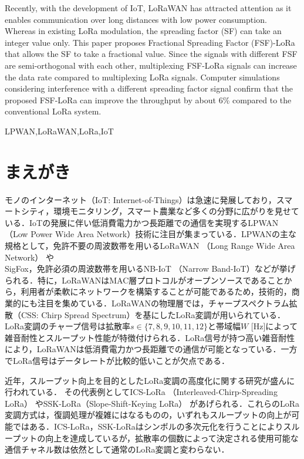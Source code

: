 \documentclass[technicalreport]{ieicej}
\begin{document}
\begin{eabstract}
Recently, with the development of IoT, LoRaWAN has attracted attention as it enables communication over long distances with low power consumption.
Whereas in existing LoRa modulation, the spreading factor (SF) can take an integer value only. This paper proposes Fractional Spreading Factor (FSF)-LoRa that allows the SF to take a fractional value.
Since the signals with different FSF are semi-orthogonal with each other, multiplexing FSF-LoRa signals can increase the data rate compared to multiplexing LoRa signals.
Computer simulations considering interference with a different spreading factor signal confirm that the proposed FSF-LoRa can improve the throughput by about 6\% compared to the conventional LoRa system.
\end{eabstract}
\begin{ekeyword}
LPWAN,\:LoRaWAN,\:LoRa,\:IoT
\end{ekeyword}
\maketitle

\section{まえがき}

モノのインターネット（IoT: Internet-of-Things）は急速に発展しており，スマートシティ，環境モニタリング，スマート農業など多くの分野に広がりを見せている．IoTの発展に伴い低消費電力かつ長距離での通信を実現するLPWAN（Low Power Wide Area Network）技術に注目が集まっている\cite{7815384}．LPWANの主な規格として，免許不要の周波数帯を用いるLoRaWAN （Long Range Wide Area Network）\cite{7803607} やSigFox\cite{sigfox}，免許必須の周波数帯を用いるNB-IoT （Narrow Band-IoT）\cite{7876968}などが挙げられる．特に，LoRaWANはMAC層プロトコルがオープンソースであることから，利用者が柔軟にネットワークを構築することが可能であるため，技術的，商業的にも注目を集めている\cite{7803607,8795313}．LoRaWANの物理層では，チャープスペクトラム拡散（CSS: Chirp Spread Spectrum）を基にしたLoRa変調が用いられている\cite{WhatIsLoRa}．LoRa変調のチャープ信号は拡散率$s\in\{7, 8, 9, 10, 11, 12\}$と帯域幅$W$ [Hz]によって雑音耐性とスループット性能が特徴付けられる．LoRa信号が持つ高い雑音耐性により，LoRaWANは低消費電力かつ長距離での通信が可能となっている．一方でLoRa信号はデータレートが比較的低いことが欠点である．

近年，スループット向上を目的としたLoRa変調の高度化に関する研究が盛んに行われている\cite{10391276}．
その代表例としてICS-LoRa （Interleaved-Chirp-Spreading LoRa） \cite{8607020}やSSK-LoRa（Slope-Shift-Keying LoRa） \cite{9709288}があげられる．これらのLoRa変調方式は，復調処理が複雑にはなるものの，いずれもスループットの向上が可能ではある．ICS-LoRa，SSK-LoRaはシンボルの多次元化を行うことによりスループットの向上を達成しているが，拡散率の個数によって決定される使用可能な通信チャネル数は依然として通常のLoRa変調と変わらない．
\end{document}
